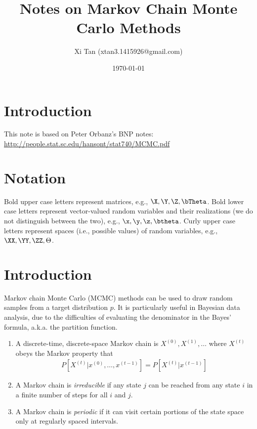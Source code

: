 \documentclass{article}
\title{Notes on Markov Chain Monte Carlo Methods}
\author{Xi Tan (xtan3.1415926@gmail.com)}
\date{\today}
\newcommand{\dual}[2]{{#1}^{(#2)}} %
\begin{document}
\maketitle
\tableofcontents


\section{Introduction}
This note is based on Peter Orbanz's BNP notes:
\vspace*{5mm}
\\
\url{http://people.stat.sc.edu/hansont/stat740/MCMC.pdf}

\section{Notation}
Bold upper case letters represent matrices, e.g., $\X, \Y, \Z, \bTheta$. Bold lower case letters represent vector-valued random variables and their realizations (we do not distinguish between the two), e.g., $\x, \y, \z, \btheta$. Curly upper case letters represent spaces (i.e., possible values) of random variables, e.g., $\XX, \YY, \ZZ, \Theta$.

\section{Introduction}
Markov chain Monte Carlo (MCMC) methods can be used to draw random samples from a target distribution $p$. It is particularly useful in Bayesian data analysis, due to the difficulties of evaluating the denominator in the Bayes' formula, a.k.a. the partition function.

\begin{enumerate}
\item A discrete-time, discrete-space Markov chain is $\dual{X}{0}, \dual{X}{1}, \dots$ where $\dual{X}{t}$ obeys the Markov property that
\begin{align}
P\left[\dual{X}{t} \bigg| \dual{x}{0},\dots,\dual{x}{t-1}\right] = P\left[\dual{X}{t} \bigg| \dual{x}{t-1} \right]
\end{align}
\item A Markov chain is {\em{irreducible}} if any state $j$ can be reached from any state $i$ in a finite number of steps for all $i$ and $j$.
\item A Markov chain is {\em{periodic}} if it can visit certain portions of the state space only at regularly spaced intervals.
\end{enumerate}
\end{document}
